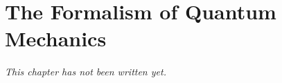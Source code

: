\chapter{The Formalism of Quantum Mechanics}\label{ch:b3:quantum-formalism}


\emph{This chapter has not been written yet.}
